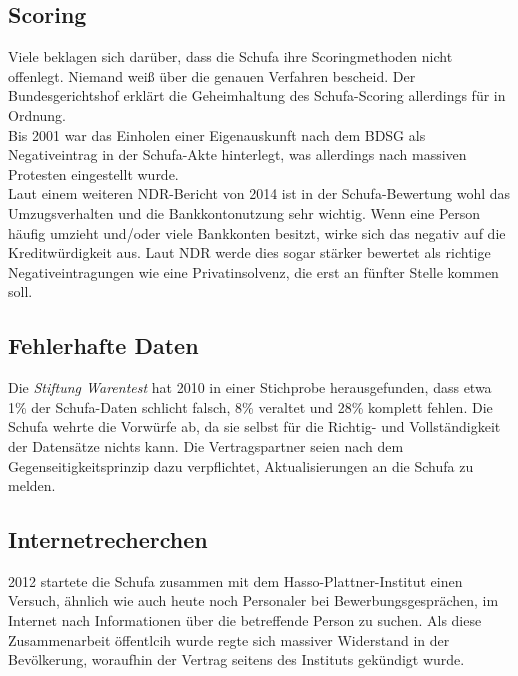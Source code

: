 \documentclass[12pt]{article}
\begin{document}
\subsection{Scoring}

Viele beklagen sich darüber, dass die Schufa ihre Scoringmethoden nicht offenlegt. Niemand weiß über die genauen Verfahren bescheid.
Der Bundesgerichtshof erklärt die Geheimhaltung des Schufa-Scoring allerdings für in Ordnung.\\

Bis 2001 war das Einholen einer Eigenauskunft nach dem BDSG als Negativeintrag in der Schufa-Akte hinterlegt, was allerdings nach massiven Protesten eingestellt wurde.\\

Laut einem weiteren NDR-Bericht von 2014 ist in der Schufa-Bewertung wohl das Umzugsverhalten und die Bankkontonutzung sehr wichtig. Wenn eine Person häufig umzieht und/oder viele Bankkonten besitzt,
wirke sich das negativ auf die Kreditwürdigkeit aus. Laut NDR werde dies sogar stärker bewertet als richtige Negativeintragungen wie eine Privatinsolvenz, die erst an fünfter Stelle kommen soll.


\subsection{Fehlerhafte Daten}
Die \textit{Stiftung Warentest} hat 2010 in einer Stichprobe herausgefunden, dass etwa 1\% der Schufa-Daten schlicht falsch, 8\% veraltet und 28\% komplett fehlen.
Die Schufa wehrte die Vorwürfe ab, da sie selbst für die Richtig- und Vollständigkeit der Datensätze nichts kann. Die Vertragspartner seien nach dem Gegenseitigkeitsprinzip dazu verpflichtet,
Aktualisierungen an die Schufa zu melden.

\subsection{Internetrecherchen}
2012 startete die Schufa zusammen mit dem Hasso-Plattner-Institut einen Versuch, ähnlich wie auch heute noch Personaler bei Bewerbungsgesprächen, im Internet nach Informationen über die betreffende
Person zu suchen. Als diese Zusammenarbeit öffentlcih wurde regte sich massiver Widerstand in der Bevölkerung, woraufhin der Vertrag seitens des Instituts gekündigt wurde.

\newpage
\end{document}
